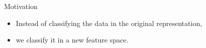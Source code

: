 \begin{vbframe}{Motivation}
\begin{itemize}
\item Instead of classifying the data in the original representation,
\begin{figure}
\centering
{}
\end{figure}
\item we classify it in a new feature space.
\begin{figure}
\centering
{}
\end{figure}
\end{itemize}
\framebreak


\end{vbframe}
